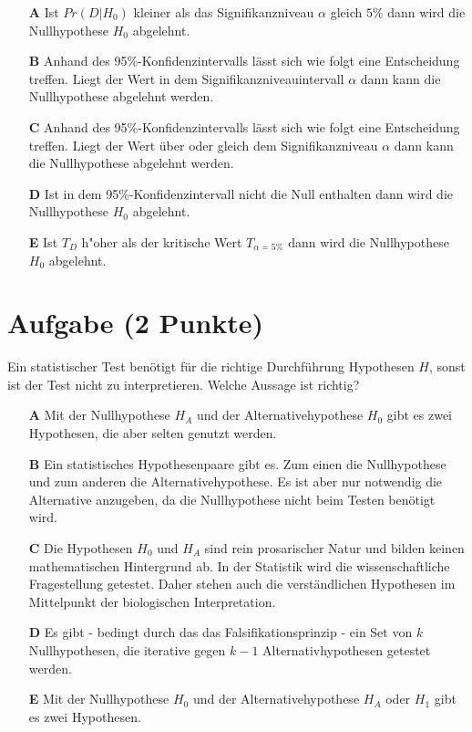 \documentclass[a4paper, 9pt]{scrartcl}\usepackage[]{graphicx}\usepackage[]{xcolor}
\begin{document}
\begin{enumerate}
\item [\textbf{A} \msquare] Ist $Pr(D|H_0)$ kleiner als das Signifikanzniveau $\alpha$ gleich $5\%$ dann wird die Nullhypothese $H_0$ abgelehnt.
\item [\textbf{B} \msquare] Anhand des 95\%-Konfidenzintervalls lässt sich wie folgt eine Entscheidung treffen. Liegt der Wert in dem Signifikanzniveauintervall $\alpha$ dann kann die Nullhypothese abgelehnt werden.
\item [\textbf{C} \msquare] Anhand des 95\%-Konfidenzintervalls lässt sich wie folgt eine Entscheidung treffen. Liegt der Wert über oder gleich dem Signifikanzniveau $\alpha$ dann kann die Nullhypothese abgelehnt werden.
\item [\textbf{D} \msquare] Ist in dem 95\%-Konfidenzintervall nicht die Null enthalten dann wird die Nullhypothese $H_0$ abgelehnt.
\item [\textbf{E} \msquare] Ist $T_{D}$ h{"o}her als der kritische Wert $T_{\alpha = 5\%}$ dann wird die Nullhypothese $H_0$ abgelehnt.
\end{enumerate}

\section{Aufgabe \hfill (2 Punkte)}



Ein statistischer Test benötigt für die richtige Durchführung Hypothesen $H$, sonst ist der Test nicht zu interpretieren. Welche Aussage ist richtig?



\begin{enumerate}
\item [\textbf{A} \msquare] Mit der Nullhypothese $H_A$ und der Alternativehypothese $H_0$ gibt es zwei Hypothesen, die aber selten genutzt werden.
\item [\textbf{B} \msquare] Ein statistisches Hypothesenpaare gibt es. Zum einen die Nullhypothese und zum anderen die Alternativehypothese. Es ist aber nur notwendig die Alternative anzugeben, da die Nullhypothese nicht beim Testen benötigt wird.
\item [\textbf{C} \msquare] Die Hypothesen $H_0$ und $H_A$ sind rein prosarischer Natur und bilden keinen mathematischen Hintergrund ab. In der Statistik wird die wissenschaftliche Fragestellung getestet. Daher stehen auch die verständlichen Hypothesen im Mittelpunkt der biologischen Interpretation.
\item [\textbf{D} \msquare] Es gibt - bedingt durch das das Falsifikationsprinzip - ein Set von $k$ Nullhypothesen, die iterative gegen $k-1$ Alternativhypothesen getestet werden.
\item [\textbf{E} \msquare] Mit der Nullhypothese $H_0$ und der Alternativehypothese $H_A$ oder $H_1$ gibt es zwei Hypothesen.
\end{enumerate}
\end{document}
